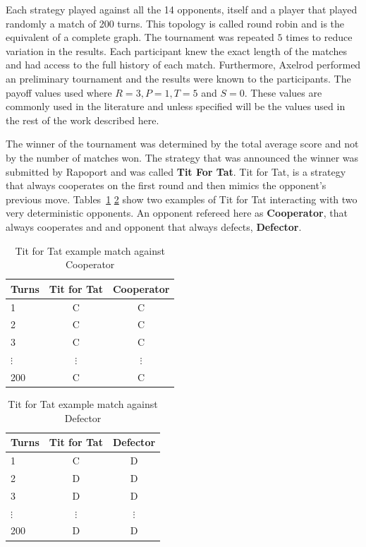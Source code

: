 \documentclass{article}
\begin{document}
Each strategy played against all the 14 opponents, itself and a player that played
randomly a match of 200 turns. This topology is called round robin and is the 
equivalent of a complete graph. The tournament was repeated \(5\) times to
reduce variation in the results. Each participant knew the exact length of the
matches and had access to the full history of each match. Furthermore, Axelrod
performed an preliminary tournament and the results were known to the participants.
The payoff values used where \(R=3, P=1, T=5\) and \(S=0\). These values are
commonly used in the literature and unless specified will be the values used in
the rest of the work described here. 

The winner of the tournament was determined by the total average score and not by
the number of matches won. The strategy that was announced the winner was
submitted by Rapoport and was called \textbf{Tit For Tat}. Tit for Tat, is a 
strategy that always cooperates on the first round and then mimics the opponent's
previous move. Tables~\ref{table:tft_vs_c} \ref{table:tft_vs_d} show two
examples of Tit for Tat interacting with two very deterministic opponents.
An opponent refereed here as \textbf{Cooperator}, that always cooperates and
and opponent that always defects, \textbf{Defector}.

\begin{table}[!hbtp]
    \begin{center}
    \begin{tabular}{lcc}
        \toprule
        Turns & Tit for Tat & Cooperator\\
        \toprule
        1 & C & C\\
        2 & C & C\\
        3 & C & C\\
        $\vdots$ & $\vdots$ & $\vdots$ \\
        200 & C & C \\
        \bottomrule
    \end{tabular}
    \caption{Tit for Tat example match against Cooperator}\label{table:tft_vs_c}
    \end{center}
\end{table}

\begin{table}[!hbtp]
    \begin{center}
    \begin{tabular}{lcc}
        \toprule
        Turns & Tit for Tat & Defector\\
        \toprule
        1 & C & D\\
        2 & D & D\\
        3 & D & D\\ 
        $\vdots$ & $\vdots$ & $\vdots$ \\ 
        200 & D & D \\
        \bottomrule
    \end{tabular}
    \caption{Tit for Tat example match against Defector}\label{table:tft_vs_d}
\end{center}
\end{table}
\end{document}
